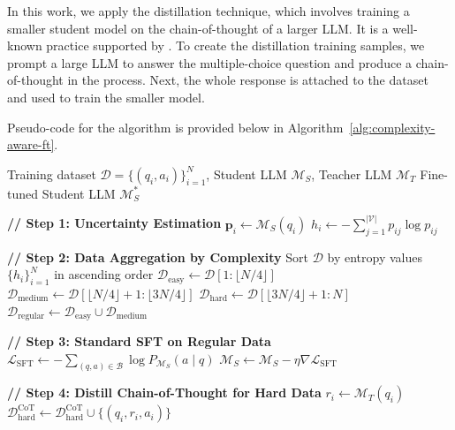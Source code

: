 In this work, we apply the distillation technique, which involves training a smaller student model on the chain-of-thought of a larger LLM. It is a well-known practice supported by \cite{hsieh2023distillingstepbystepoutperforminglarger}. 
To create the distillation training samples, we prompt a large LLM to answer the multiple-choice question and produce a chain-of-thought in the process. Next, the whole response is attached to the dataset and used to train the smaller model. 

Pseudo-code for the algorithm is provided below in Algorithm~\ref{alg:complexity-aware-ft}.

\begin{algorithm}
\caption{Complexity-Aware Fine-Tuning Pipeline}
\label{alg:complexity-aware-ft}
\begin{algorithmic}[1]
\Require Training dataset $\mathcal{D} = \{(q_i, a_i)\}_{i=1}^{N}$, Student LLM $\mathcal{M}_S$, Teacher LLM $\mathcal{M}_T$
\Ensure Fine-tuned Student LLM $\mathcal{M}_S^*$

\Statex \textbf{// Step 1: Uncertainty Estimation}
    \State $\mathbf{p}_i \gets \mathcal{M}_S(q_i)$ 
    \State $h_i \gets -\sum_{j=1}^{|\mathcal{V}|} p_{ij} \log p_{ij}$ 
\EndFor

\Statex
\Statex \textbf{// Step 2: Data Aggregation by Complexity}
\State Sort $\mathcal{D}$ by entropy values $\{h_i\}_{i=1}^{N}$ in ascending order
\State $\mathcal{D}_{\text{easy}} \gets \mathcal{D}[1 : \lfloor N/4 \rfloor]$ 
\State $\mathcal{D}_{\text{medium}} \gets \mathcal{D}[\lfloor N/4 \rfloor + 1 : \lfloor 3N/4 \rfloor]$
\State $\mathcal{D}_{\text{hard}} \gets \mathcal{D}[\lfloor 3N/4 \rfloor + 1 : N]$ 
\State $\mathcal{D}_{\text{regular}} \gets \mathcal{D}_{\text{easy}} \cup \mathcal{D}_{\text{medium}}$

\Statex
\Statex \textbf{// Step 3: Standard SFT on Regular Data}
        \State $\mathcal{L}_{\text{SFT}} \gets -\sum_{(q,a) \in \mathcal{B}} \log P_{\mathcal{M}_S}(a \mid q)$
        \State $\mathcal{M}_S \gets \mathcal{M}_S - \eta \nabla \mathcal{L}_{\text{SFT}}$
    \EndFor
\EndFor

\Statex
\Statex \textbf{// Step 4: Distill Chain-of-Thought for Hard Data}
    \State $r_i \gets \mathcal{M}_T(q_i)$ 
    \State $\mathcal{D}_{\text{hard}}^{\text{CoT}} \gets \mathcal{D}_{\text{hard}}^{\text{CoT}} \cup \{(q_i, r_i, a_i)\}$
\EndFor


\end{algorithmic}
\end{algorithm}
